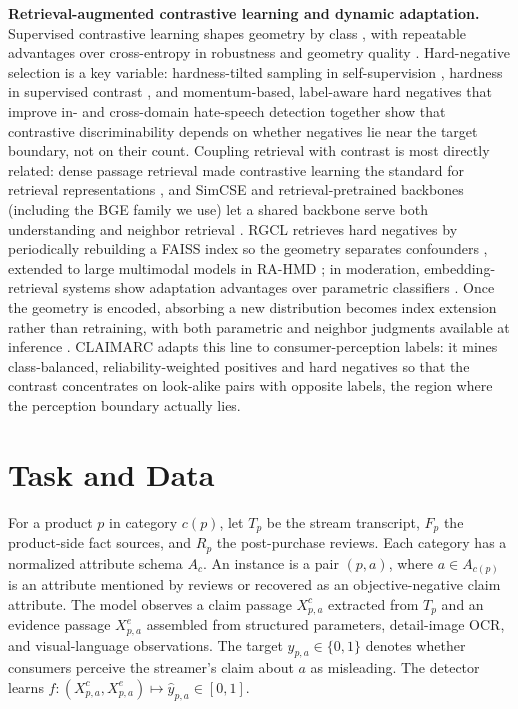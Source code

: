 \documentclass[letterpaper]{article}
\begin{document}
\textbf{Retrieval-augmented contrastive learning and dynamic adaptation.} Supervised contrastive learning shapes geometry by class \citep{khosla2020supcon}, with repeatable advantages over cross-entropy in robustness and geometry quality \citep{graf2021dissecting}. Hard-negative selection is a key variable: hardness-tilted sampling in self-supervision \citep{robinson2020hardneg}, hardness in supervised contrast \citep{jiang2022hscl}, and momentum-based, label-aware hard negatives that improve in- and cross-domain hate-speech detection \citep{kim2024lahn} together show that contrastive discriminability depends on whether negatives lie near the target boundary, not on their count. Coupling retrieval with contrast is most directly related: dense passage retrieval made contrastive learning the standard for retrieval representations \citep{karpukhin2020dpr}, and SimCSE and retrieval-pretrained backbones (including the BGE family we use) let a shared backbone serve both understanding and neighbor retrieval \citep{gao2021simcse,xiao2023cpack}. RGCL retrieves hard negatives by periodically rebuilding a FAISS index so the geometry separates confounders \citep{mei2024rgcl}, extended to large multimodal models in RA-HMD \citep{mei2025rahmd}; in moderation, embedding-retrieval systems show adaptation advantages over parametric classifiers \citep{wang2025moderation,long2023retrievalicl,johnson2019faiss}. Once the geometry is encoded, absorbing a new distribution becomes index extension rather than retraining, with both parametric and neighbor judgments available at inference \citep{wang2020alignment}. CLAIMARC adapts this line to consumer-perception labels: it mines class-balanced, reliability-weighted positives and hard negatives so that the contrast concentrates on look-alike pairs with opposite labels, the region where the perception boundary actually lies.

\section{Task and Data}

For a product $p$ in category $c(p)$, let $T_p$ be the stream transcript, $F_p$ the product-side fact sources, and $R_p$ the post-purchase reviews. Each category has a normalized attribute schema $A_c$. An instance is a pair $(p,a)$, where $a \in A_{c(p)}$ is an attribute mentioned by reviews or recovered as an objective-negative claim attribute. The model observes a claim passage $X^c_{p,a}$ extracted from $T_p$ and an evidence passage $X^e_{p,a}$ assembled from structured parameters, detail-image OCR, and visual-language observations. The target $y_{p,a}\in\{0,1\}$ denotes whether consumers perceive the streamer's claim about $a$ as misleading. The detector learns $f:(X^c_{p,a},X^e_{p,a})\mapsto\hat y_{p,a}\in[0,1]$.
\end{document}

